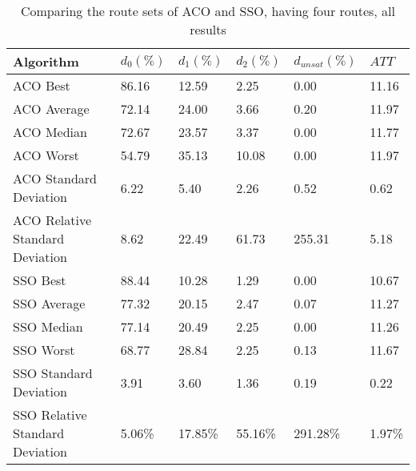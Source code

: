     \begin{table}[H]
    \centering
    \begin{tabular}{|l||l|l|l|l|l|}
    \hline
    Algorithm & $d_0(\%)$ & $d_1(\%)$ & $d_2(\%)$ & $d_{unsat}(\%)$ & $ATT$ \\
    \hline
    ACO Best & 86.16 & 12.59 & 2.25 & 0.00 & 11.16 \\
    ACO Average & 72.14 & 24.00 & 3.66 & 0.20 & 11.97 \\
    ACO Median & 72.67 & 23.57 & 3.37 & 0.00 & 11.77 \\
    ACO Worst & 54.79 & 35.13 & 10.08 & 0.00 & 11.97 \\
    ACO Standard Deviation & 6.22 & 5.40 & 2.26 & 0.52 & 0.62 \\
    ACO Relative Standard Deviation & 8.62 & 22.49 & 61.73 & 255.31 & 5.18 \\
    \hline
    \hline
    SSO Best & 88.44 & 10.28 & 1.29 & 0.00 & 10.67 \\
    SSO Average & 77.32 & 20.15 & 2.47 & 0.07 & 11.27 \\
    SSO Median & 77.14 & 20.49 & 2.25 & 0.00 & 11.26 \\
    SSO Worst & 68.77 & 28.84 & 2.25 & 0.13 & 11.67 \\
    SSO Standard Deviation & 3.91 & 3.60 & 1.36 & 0.19 & 0.22 \\
    SSO Relative Standard Deviation & 5.06\% & 17.85\% & 55.16\% & 291.28\% & 1.97\% \\
    \hline
    \end{tabular}
    \caption {Comparing the route sets of ACO and SSO, having four routes, all results}
    \label{table:performanceComparison_ACOFull}
    \end{table}


